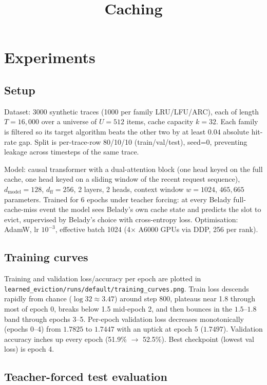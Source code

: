 \documentclass{article}
\title{Caching}
\begin{document}
\maketitle

\section{Experiments}

\subsection{Setup}

Dataset: 3000 synthetic traces (1000 per family LRU/LFU/ARC), each of length
$T{=}16{,}000$ over a universe of $U{=}512$ items, cache capacity $k{=}32$.
Each family is filtered so its target algorithm beats the other two by at
least $0.04$ absolute hit-rate gap. Split is per-trace-row 80/10/10
(train/val/test), seed=0, preventing leakage across timesteps of the same
trace.

Model: causal transformer with a dual-attention block (one head keyed on the
full cache, one head keyed on a sliding window of the recent request
sequence), $d_{\text{model}}{=}128$, $d_{\text{ff}}{=}256$, 2 layers, 2 heads,
context window $w{=}1024$, $465{,}665$ parameters. Trained for 6 epochs under
teacher forcing: at every Belady full-cache-miss event the model sees
Belady's own cache state and predicts the slot to evict, supervised by
Belady's choice with cross-entropy loss. Optimisation: AdamW, lr $10^{-3}$,
effective batch 1024 (4$\times$ A6000 GPUs via DDP, 256 per rank).

\subsection{Training curves}

Training and validation loss/accuracy per epoch are plotted in
\texttt{learned\_eviction/runs/default/training\_curves.png}. Train loss
descends rapidly from chance ($\log 32 \approx 3.47$) around step 800, plateaus
near 1.8 through most of epoch 0, breaks below 1.5 mid-epoch 2, and then
bounces in the $1.5\text{--}1.8$ band through epochs 3--5. Per-epoch
validation loss decreases monotonically (epochs 0--4) from $1.7825$ to
$1.7447$ with an uptick at epoch 5 ($1.7497$). Validation accuracy inches up
every epoch (51.9\% $\to$ 52.5\%). Best checkpoint (lowest val loss) is
epoch 4.

\subsection{Teacher-forced test evaluation}
\end{document}
